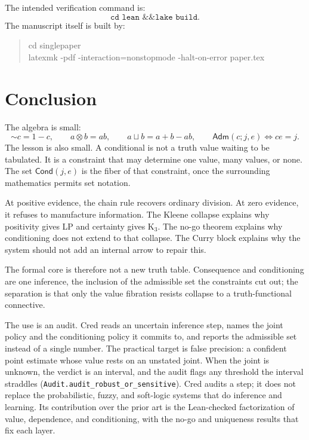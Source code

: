 \documentclass[11pt,a4paper]{article}
\newcommand{\Cond}{\mathsf{Cond}}
\newcommand{\Adm}{\mathsf{Adm}}
\newcommand{\negc}{\mathord{\sim}}
\newcommand{\conjc}{\otimes}
\newcommand{\disjc}{\sqcup}
\newcommand{\Lean}[1]{\texttt{#1}}
\begin{document}
The intended verification command is:
\[
  \texttt{cd lean \&\& lake build}.
\]
The manuscript itself is built by:
\begin{quote}\small\ttfamily
cd singlepaper\\
latexmk -pdf -interaction=nonstopmode -halt-on-error paper.tex
\end{quote}

\section{Conclusion}

The algebra is small:
\[
  \negc c=1-c,\qquad a\conjc b=ab,\qquad
  a\disjc b=a+b-ab,\qquad \Adm(c;j,e)\Longleftrightarrow ce=j.
\]
The lesson is also small.  A conditional is not a truth value waiting
to be tabulated.  It is a constraint that may determine one value,
many values, or none.  The set $\Cond(j,e)$ is the fiber of that
constraint, once the surrounding mathematics permits set notation.

At positive evidence, the chain rule recovers ordinary division.  At
zero evidence, it refuses to manufacture information.  The Kleene
collapse explains why positivity gives LP and certainty gives K$_3$.
The no-go theorem explains why conditioning does not extend to
that collapse.  The Curry block explains why the system should not add
an internal arrow to repair this.

The formal core is therefore not a new truth table.  Consequence and
conditioning are one inference, the inclusion of the admissible set the
constraints cut out; the separation is that only the value fibration
resists collapse to a truth-functional connective.

The use is an audit.  Cred reads an uncertain inference step, names the
joint policy and the conditioning policy it commits to, and reports the
admissible set instead of a single number.  The practical target is
false precision: a confident point estimate whose value rests on an
unstated joint.  When the joint is unknown, the verdict is an interval,
and the audit flags any threshold the interval straddles
(\Lean{Audit.audit\_robust\_or\_sensitive}).  Cred audits a step; it
does not replace the probabilistic, fuzzy, and soft-logic systems that
do inference and learning.  Its contribution over the prior art is the
Lean-checked factorization of value, dependence, and conditioning, with
the no-go and uniqueness results that fix each layer.



\end{document}
